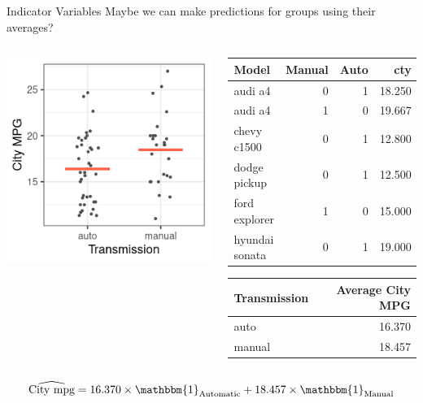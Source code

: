 \documentclass{beamer}
\begin{document}
\begin{frame}{Indicator Variables}
Maybe we can make predictions for groups using their averages?
\scriptsize
\begin{columns}
  \begin{column}{0.45\textwidth}
	\begin{center}
	\includegraphics[scale=0.5]{trans_reg.png}
	\end{center}
  \end{column}

  \begin{column}{0.5\textwidth}
\begin{table}[ht]
\centering
\begin{tabular}{lrrr}
  \hline
Model & Manual & Auto & cty \\ 
  \hline
audi a4 & 0 & 1 & 18.250 \\ 
  audi a4 & 1 & 0 & 19.667 \\ 
  chevy c1500 & 0 & 1 & 12.800 \\ 
  dodge pickup & 0 & 1 & 12.500 \\ 
  ford explorer & 1 & 0 & 15.000 \\ 
  hyundai sonata & 0 & 1 & 19.000 \\ 
   \hline
\end{tabular}
\end{table}

\begin{table}[ht]
\centering
\begin{tabular}{lr}
  \hline
Transmission & Average City MPG \\ 
  \hline
auto & 16.370 \\ 
  manual & 18.457 \\ 
   \hline
\end{tabular}
\end{table}
  \end{column}
\end{columns}

\begin{align*}
\widehat{\text{City mpg}} = 16.370 \times \mathbbm{1}_{\text{Automatic}} + 18.457 \times \mathbbm{1}_{\text{Manual}}
\end{align*}
\end{frame}
\end{document}
